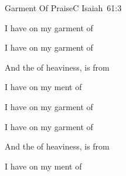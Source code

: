 \documentclass[12pt, spanish]{book}
\newcommand{\RevDate}{\today}
\newcommand{\NotCCLIed}{\relax}
\begin{document}
\begin{song}{Garment Of Praise}{C}
  {}
  {}
  {Isaiah~61:3}
  {\NotCCLIed}

  \renewcommand{\RevDate}{February~11,~1993}

  \begin{SBOpGroup}
    I have  on my garment of 
    
    I have  on my garment of 
    
    And the  of heaviness, is  from 
    
    I have  on my ment of  \ChX{[}{} \ChX{]}{}
  \end{SBOpGroup}

  \begin{SBExtraKeys}{

    \begin{SBOpGroup}
      I have  on my garment of 
      
      I have  on my garment of 
      
      And the  of heaviness, is  from 
      
      I have  on my ment of  \Ch{[}{} \Ch{]}{}
    \end{SBOpGroup}
  }\end{SBExtraKeys}
\end{song}





\end{document}
